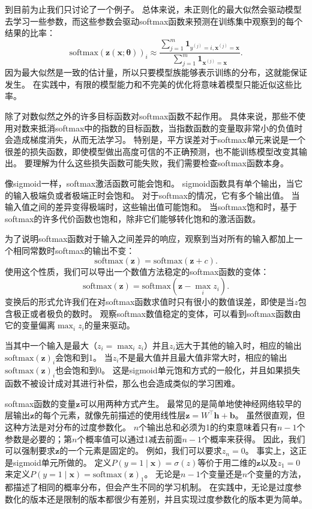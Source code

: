 到目前为止我们只讨论了一个例子。
总体来说，未正则化的最大似然会驱动模型去学习一些参数，而这些参数会驱动softmax函数来预测在训练集中观察到的每个结果的比率：
\begin{equation}
\text{softmax}(\bm{z}(\bm{x}; \bm{\theta}))_i \approx \frac{\sum_{j=1}^m \bm{1}_{y^{(j)}=i, \bm{x}^{(j)} = \bm{x}}  }{ \sum_{j=1}^{m} \bm{1}_{\bm{x}^{(j)} = \bm{x}} }.
\end{equation}
因为最大似然是一致的估计量，所以只要模型族能够表示训练的分布，这就能保证发生。
在实践中，有限的模型能力和不完美的优化将意味着模型只能近似这些比率。

除了对数似然之外的许多目标函数对softmax函数不起作用。
具体来说，那些不使用对数来抵消softmax中的指数的目标函数，当指数函数的变量取非常小的负值时会造成梯度消失，从而无法学习。
特别是，平方误差对于softmax单元来说是一个很差的损失函数，即使模型做出高度可信的不正确预测，也不能训练模型改变其输出\citep{Bridle90}。
要理解为什么这些损失函数可能失败，我们需要检查softmax函数本身。

像\gls{sigmoid}一样，softmax激活函数可能会饱和。
\gls{sigmoid}函数具有单个输出，当它的输入极端负或者极端正时会饱和。
对于softmax的情况，它有多个输出值。
当输入值之间的差异变得极端时，这些输出值可能饱和。
当softmax饱和时，基于softmax的许多代价函数也饱和，除非它们能够转化饱和的激活函数。


为了说明softmax函数对于输入之间差异的响应，观察到当对所有的输入都加上一个相同常数时softmax的输出不变：
\begin{equation}
\text{softmax}(\bm{z}) = \text{softmax}(\bm{z}+c).
\end{equation}
使用这个性质，我们可以导出一个数值方法稳定的softmax函数的变体：
\begin{equation}
\text{softmax}(\bm{z}) = \text{softmax}(\bm{z}- \max_i z_i).
\end{equation}
变换后的形式允许我们在对softmax函数求值时只有很小的数值误差，即使是当$z$包含极正或者极负的数时。
观察softmax数值稳定的变体，可以看到softmax函数由它的变量偏离$\max_i z_i$的量来驱动。

当其中一个输入是最大（$z_i = \max_i z_i$）并且$z_i$远大于其他的输入时，相应的输出$\text{softmax}(\bm{z})_i$会饱和到1。
当$z_i$不是最大值并且最大值非常大时，相应的输出$\text{softmax}(\bm{z})_i$也会饱和到0。
这是\gls{sigmoid}单元饱和方式的一般化，并且如果损失函数不被设计成对其进行补偿，那么也会造成类似的学习困难。

softmax函数的变量$\bm{z}$可以用两种方式产生。
最常见的是简单地使神经网络较早的层输出$\bm{z}$的每个元素，就像先前描述的使用线性层$\bm{z}={W}^\top\bm{h}+\bm{b}$。
虽然很直观，但这种方法是对分布的过度参数化。
$n$个输出总和必须为1的约束意味着只有$n-1$个参数是必要的；第$n$个概率值可以通过1减去前面$n-1$个概率来获得。
因此，我们可以强制要求$\bm{z}$的一个元素是固定的。
例如，我们可以要求$z_n=0$。
事实上，这正是\gls{sigmoid}单元所做的。
定义$P(y=1\mid\bm{x})=\sigma(z)$等价于用二维的$\bm{z}$以及$z_1=0$来定义$P(y=1\mid\bm{x})=\text{softmax}(\bm{z})_1$。
无论是$n-1$个变量还是$n$个变量的方法，都描述了相同的概率分布，但会产生不同的学习机制。
在实践中，无论是过度参数化的版本还是限制的版本都很少有差别，并且实现过度参数化的版本更为简单。

